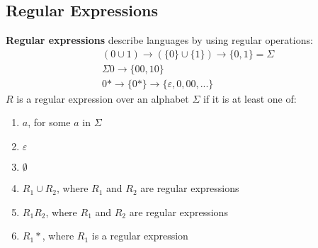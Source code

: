 \documentclass{article}
\begin{document}
\subsection{Regular Expressions}
\textbf{Regular expressions} describe languages by using regular operations:
\begin{align*}
    &(0 \cup 1) \rightarrow (\{0\} \cup \{1\}) \rightarrow \{0,1\} = \Sigma \\
    &\Sigma 0 \rightarrow \{00,10\} \\
    &0* \rightarrow\{0*\} \rightarrow \{\varepsilon,0, 00, ...\}
\end{align*}
$R$ is a regular expression over an alphabet $\Sigma$ if it is at least one of:
\begin{enumerate}
    \item $a$, for some $a$ in $\Sigma$
    \item $\varepsilon$
    \item $\emptyset$
    \item $R_1 \cup R_2$, where $R_1$ and $R_2$ are regular expressions
    \item $R_1R_2$, where $R_1$ and $R_2$ are regular expressions
    \item $R_1*$, where $R_1$ is a regular expression
\end{enumerate}
\end{document}

